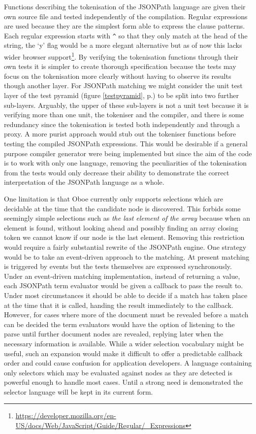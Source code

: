\documentclass[12pt, ]{article}
\begin{document}
Functions describing the tokenisation of the JSONPath language are given
their own source file and tested independently of the compilation.
Regular expressions are used because they are the simplest form able to
express the clause patterns. Each regular expression starts with
\texttt{\^{}} so that they only match at the head of the string, the `y'
flag would be a more elegant alternative but as of now this lacks wider
browser support\footnote{\url{https://developer.mozilla.org/en-US/docs/Web/JavaScript/Guide/Regular/_Expressions}}.
By verifying the tokenisation functions through their own tests it is
simpler to create thorough specification because the tests may focus on
the tokenisation more clearly without having to observe its results
though another layer. For JSONPath matching we might consider the unit
test layer of the test pyramid (figure \ref{testpyramid},
p.\pageref{testpyramid}) to be split into two further sub-layers.
Arguably, the upper of these sub-layers is not a unit test because it is
verifying more than one unit, the tokeniser and the compiler, and there
is some redundancy since the tokenisation is tested both independently
and through a proxy. A more purist approach would stub out the tokeniser
functions before testing the compiled JSONPath expressions. This would
be desirable if a general purpose compiler generator were being
implemented but since the aim of the code is to work with only one
language, removing the peculiarities of the tokenisation from the tests
would only decrease their ability to demonstrate the correct
interpretation of the JSONPath language as a whole.

One limitation is that Oboe currently only supports selections which are
decidable at the time that the candidate node is discovered. This
forbids some seemingly simple selections such as \emph{the last element
of the array} because when an element is found, without looking ahead
and possibly finding an array closing token we cannot know if our node
is the last element. Removing this restriction would require a fairly
substantial rewrite of the JSONPath engine. One strategy would be to
take an event-driven approach to the matching. At present matching is
triggered by events but the tests themselves are expressed
synchronously. Under an event-driven matching implementation, instead of
returning a value, each JSONPath term evaluator would be given a
callback to pass the result to. Under most circumstances it should be
able to decide if a match has taken place at the time that it is called,
handing the result immediately to the callback. However, for cases where
more of the document must be revealed before a match can be decided the
term evaluators would have the option of listening to the parse until
further document nodes are revealed, replying later when the necessary
information is available. While a wider selection vocabulary might be
useful, such an expansion would make it difficult to offer a predictable
callback order and could cause confusion for application developers. A
language containing only selectors which may be evaluated against nodes
as they are detected is powerful enough to handle most cases. Until a
strong need is demonstrated the selector language will be kept in its
current form.
\end{document}

